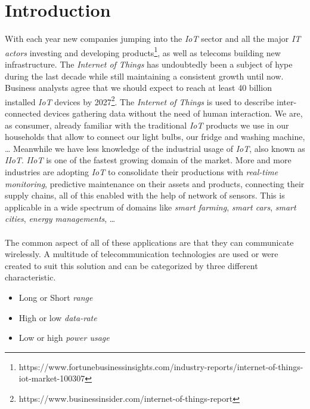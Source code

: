 \section{Introduction}

With each year new companies jumping into the \emph{IoT} sector and all the
major \emph{IT actors} investing and developing
products\footnote{https://www.fortunebusinessinsights.com/industry-reports/internet-of-things-iot-market-100307},
as well as telecoms building new infrastructure. The \emph{Internet of Things}
has undoubtedly been a subject of hype during the last decade while still
maintaining a consistent growth until now.
Business analysts agree that we should expect to reach at least 40 billion
installed \emph{IoT} devices by
2027\footnote{https://www.businessinsider.com/internet-of-things-report}. The
\emph{Internet of Things} is used to describe inter-connected devices gathering
data without the need of human interaction.
We are, as consumer, already familiar with the traditional \emph{IoT} products
we use in our households that allow to connect our light bulbs, our fridge and
washing machine, \ldots
Meanwhile we have less knowledge of the industrial usage of \emph{IoT}, also
known as \emph{IIoT}. \emph{IIoT} is one of the fastest growing domain of the
market. More and more industries are adopting \emph{IoT}  to consolidate their
productions with \emph{real-time monitoring}, predictive maintenance on their
assets and products, connecting their supply chains, all of this enabled with
the help of network of sensors.
This is applicable in a wide spectrum of domains like \emph{smart farming},
\emph{smart cars}, \emph{smart cities}, \emph{energy managements}, \ldots

\paragraph{}

The common aspect of all of these applications are that they can communicate
wirelessly.
A multitude of telecommunication technologies are used or were created to suit
this solution and can be categorized by three different characteristic.

\begin{itemize}
    \item Long or Short \emph{range}
    \item High or low \emph{data-rate}
    \item Low or high \emph{power usage} 
\end{itemize}

